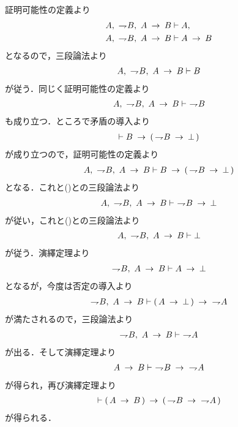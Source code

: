 	\begin{prf}
		証明可能性の定義より
		\begin{align}
			A,\ \negation B,\ A \rarrow B &\vdash A, \\
			A,\ \negation B,\ A \rarrow B &\vdash A \rarrow B
		\end{align}
		となるので，三段論法より
		\begin{align}
			A,\ \negation B,\ A \rarrow B \vdash B
			\label{fom:introduction_of_contraposition_1}
		\end{align}
		が従う．同じく証明可能性の定義より
		\begin{align}
			A,\ \negation B,\ A \rarrow B \vdash\ \negation B
			\label{fom:introduction_of_contraposition_2}
		\end{align}
		も成り立つ．ところで矛盾の導入より
		\begin{align}
			\vdash B \rarrow (\, \negation B \rarrow \bot\, )
		\end{align}
		が成り立つので，証明可能性の定義より
		\begin{align}
			A,\ \negation B,\ A \rarrow B \vdash
			B \rarrow (\, \negation B \rarrow \bot\, )
		\end{align}
		となる．これと()との三段論法より
		\begin{align}
			A,\ \negation B,\ A \rarrow B \vdash\ \negation B \rarrow \bot
		\end{align}
		が従い，これと()との三段論法より
		\begin{align}
			A,\ \negation B,\ A \rarrow B \vdash \bot
		\end{align}
		が従う．演繹定理より
		\begin{align}
			\negation B,\ A \rarrow B \vdash A \rarrow \bot
		\end{align}
		となるが，今度は否定の導入より
		\begin{align}
			\negation B,\ A \rarrow B \vdash 
			(\, A \rarrow \bot\, ) \rarrow\ \negation A
		\end{align}
		が満たされるので，三段論法より
		\begin{align}
			\negation B,\ A \rarrow B \vdash\ \negation A
		\end{align}
		が出る．そして演繹定理より
		\begin{align}
			A \rarrow B \vdash\ \negation B \rarrow\ \negation A
		\end{align}
		が得られ，再び演繹定理より
		\begin{align}
			\vdash (\, A \rarrow B\, ) \rarrow
			(\, \negation B \rarrow\ \negation A\, )
		\end{align}
		が得られる．
		\QED
	\end{prf}
	
